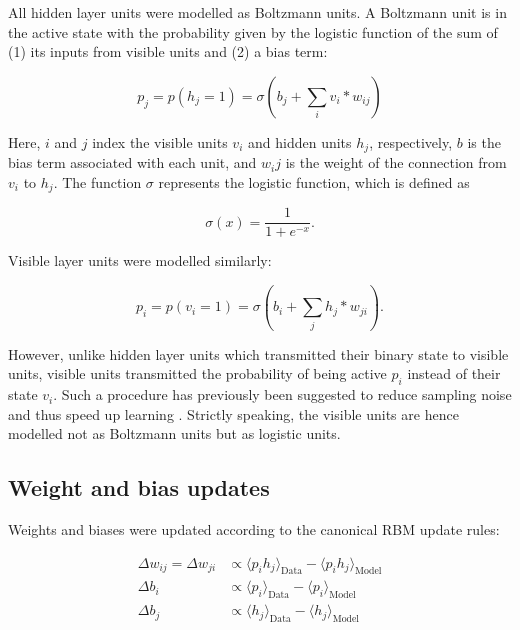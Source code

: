 \documentclass[11pt]{article}
\begin{document}
All hidden layer units were modelled as Boltzmann units. A Boltzmann
unit is in the active state with the probability given by the logistic
function of the sum of (1) its inputs from visible units and (2) a
bias term:

\begin{equation}
  p_j = p(h_j = 1) = \sigma(b_j + \sum_i v_i * w_{ij})
\end{equation}

Here, $i$ and $j$ index the visible units $v_i$ and hidden units $h_j$,
respectively, $b$ is the bias term associated with each unit, and
$w_ij$ is the weight of the connection from $v_i$ to $h_j$. The function
$\sigma$ represents the logistic function, which is defined as

\begin{equation}
  \sigma(x) = \frac{1}{1 + e^{-x}}.
\end{equation}

Visible layer units were modelled similarly:

\begin{equation}
  p_i = p(v_i = 1) = \sigma(b_i + \sum_j h_j * w_{ji}).
\end{equation}

However, unlike hidden layer units which transmitted their binary
state to visible units, visible units transmitted the probability of
being active $p_i$ instead of their state $v_i$. Such a procedure has
previously been suggested to reduce sampling noise and thus speed up
learning \cite{Hinton2012}. Strictly speaking, the visible units are
hence modelled not as Boltzmann units but as logistic units.

\subsection{Weight and bias updates}

Weights and biases were updated according to the canonical RBM update rules:

\begin{align}
  \label{eq:rbm_update_equations}
  \Delta w_{ij} = \Delta w_{ji} &\propto \langle p_{i}h_{j} \rangle_{\text{Data}} - \langle p_{i}h_{j} \rangle_{\text{Model}} \\
  \Delta b_{i}                  &\propto \langle p_{i}      \rangle_{\text{Data}} - \langle p_{i}      \rangle_{\text{Model}} \\
  \Delta b_{j}                  &\propto \langle h_{j}      \rangle_{\text{Data}} - \langle h_{j}      \rangle_{\text{Model}}
\end{align}
\end{document}
